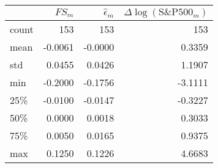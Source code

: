\begin{tabular}{lrrr}
\toprule
{} &  \(FS_m\) &  \(\hat{\epsilon}_m\) &  \(\Delta \log{(\text{S\&P500}_m)}\) \\
\midrule
count &  153 &              153 &                             153 \\
mean  &   -0.0061 &               -0.0000 &                               0.3359 \\
std   &    0.0455 &                0.0426 &                               1.1907 \\
min   &   -0.2000 &               -0.1756 &                              -3.1111 \\
25\%   &   -0.0100 &               -0.0147 &                              -0.3227 \\
50\%   &    0.0000 &                0.0018 &                               0.3033 \\
75\%   &    0.0050 &                0.0165 &                               0.9375 \\
max   &    0.1250 &                0.1226 &                               4.6683 \\
\bottomrule
\end{tabular}
